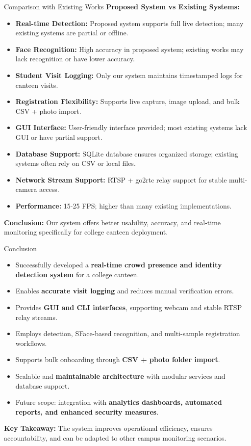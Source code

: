 \documentclass[10pt]{beamer}
\begin{document}
\begin{frame}{Comparison with Existing Works}
    \textbf{Proposed System vs Existing Systems:}

    \begin{itemize}
        \item \textbf{Real-time Detection:} Proposed system supports full live detection; many existing systems are partial or offline.
        \item \textbf{Face Recognition:} High accuracy in proposed system; existing works may lack recognition or have lower accuracy.
        \item \textbf{Student Visit Logging:} Only our system maintains timestamped logs for canteen visits.
        \item \textbf{Registration Flexibility:} Supports live capture, image upload, and bulk CSV + photo import.
        \item \textbf{GUI Interface:} User-friendly interface provided; most existing systems lack GUI or have partial support.
        \item \textbf{Database Support:} SQLite database ensures organized storage; existing systems often rely on CSV or local files.
        \item \textbf{Network Stream Support:} RTSP + go2rtc relay support for stable multi-camera access.
        \item \textbf{Performance:} 15-25 FPS; higher than many existing implementations.
    \end{itemize}

    \vspace{0.3cm}
    \textbf{Conclusion:} Our system offers better usability, accuracy, and real-time monitoring specifically for college canteen deployment.
\end{frame}
\begin{frame}{Conclusion}
    \begin{itemize}
        \item Successfully developed a \textbf{real-time crowd presence and identity detection system} for a college canteen.
        \item Enables \textbf{accurate visit logging} and reduces manual verification errors.
        \item Provides \textbf{GUI and CLI interfaces}, supporting webcam and stable RTSP relay streams.
        \item Employs detection, SFace-based recognition, and multi-sample registration workflows.
        \item Supports bulk onboarding through \textbf{CSV + photo folder import}.
        \item Scalable and \textbf{maintainable architecture} with modular services and database support.
        \item Future scope: integration with \textbf{analytics dashboards, automated reports, and enhanced security measures}.
    \end{itemize}

    \vspace{0.3cm}
    \textbf{Key Takeaway:} The system improves operational efficiency, ensures accountability, and can be adapted to other campus monitoring scenarios.
\end{frame}
\end{document}
